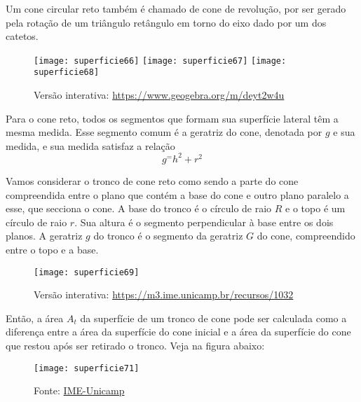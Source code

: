 Um cone circular reto também é chamado de cone de revolução, por ser gerado pela rotação de um triângulo retângulo em torno do eixo dado por um dos catetos.

\begin{figure}[H]
\centering

\texttt{[image: superficie66]}
\hspace{.5em}
\texttt{[image: superficie67]}
\hspace{.5em}
\texttt{[image: superficie68]}

\caption{Versão interativa: \url{https://www.geogebra.org/m/deyt2w4u}}
\end{figure}

Para o cone reto, todos os segmentos que formam sua superfície lateral têm a mesma medida. Esse segmento comum é a geratriz do cone, denotada por $g$ e sua medida, e sua medida satisfaz a relação 
\begin{equation*}
g^=h^2+r^2
\end{equation*}

Vamos considerar o tronco de cone reto como sendo a parte do cone compreendida entre o plano que contém a base do cone e outro plano paralelo a esse, que secciona o cone. A base do tronco é o círculo de raio $R$ e o topo é um círculo de raio $r$. Sua altura é o segmento perpendicular à base entre os dois planos. A geratriz $g$ do tronco é o segmento da geratriz $G$ do cone, compreendido entre o topo e a base.
\begin{figure}[H]
\centering

\texttt{[image: superficie69]}

\caption{Versão interativa: \url{https://m3.ime.unicamp.br/recursos/1032}}
\end{figure}

Então, a área $A_t$ da superfície de um tronco de cone pode ser calculada como a diferença entre a área da superfície do cone inicial e a área da superfície do cone que restou após ser retirado o tronco. Veja na figura abaixo:

\begin{figure}[H]
\centering

\texttt{[image: superficie71]}

\caption{Fonte: \href{https://m3.ime.unicamp.br/recursos/1032}{IME-Unicamp}}
\end{figure}

